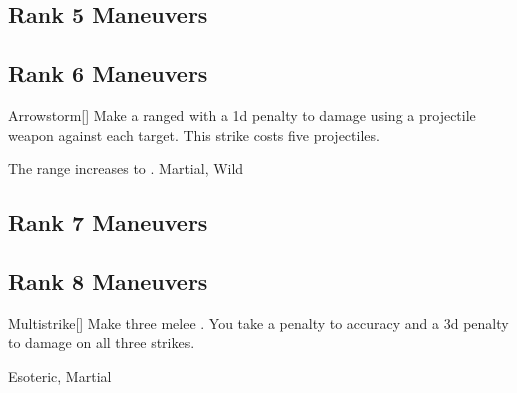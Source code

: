 \subsection{Rank 5 Maneuvers}
\subsection{Rank 6 Maneuvers}

\lowercase{\hypertarget{maneuver:Arrowstorm}{}}\label{maneuver:Arrowstorm}
\hypertarget{maneuver:Arrowstorm}{}
\begin{freeability}[Rank 6]{Arrowstorm}[]
Make a ranged  with a \minus1d penalty to damage using a projectile weapon against each target.
This strike costs five projectiles.

\rankline
{} The range increases to \rnglong.
 Martial, Wild
\end{freeability}
\vspace{0.25em}


\subsection{Rank 7 Maneuvers}
\subsection{Rank 8 Maneuvers}

\lowercase{\hypertarget{maneuver:Multistrike}{}}\label{maneuver:Multistrike}
\hypertarget{maneuver:Multistrike}{}
\begin{freeability}[Rank 8]{Multistrike}[]
Make three melee .
You take a  penalty to accuracy and a \minus3d penalty to damage on all three strikes.


 Esoteric, Martial
\end{freeability}
\vspace{0.25em}


